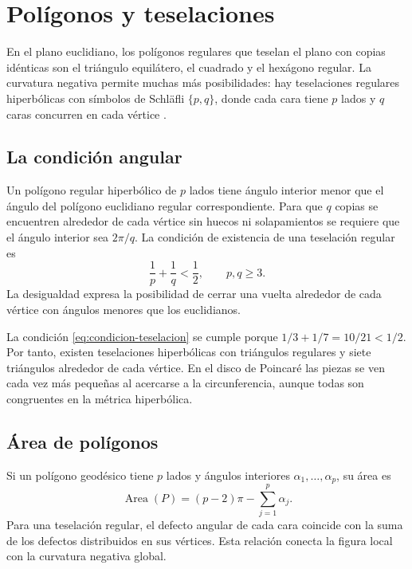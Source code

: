\chapter{Polígonos y teselaciones}
\label{cap:teselaciones}

En el plano euclidiano, los polígonos regulares que teselan el plano con copias idénticas son el triángulo equilátero, el cuadrado y el hexágono regular. La curvatura negativa permite muchas más posibilidades: hay teselaciones regulares hiperbólicas con símbolos de Schläfli \(\{p,q\}\), donde cada cara tiene \(p\) lados y \(q\) caras concurren en cada vértice \cite{stillwell1992}.

\section{La condición angular}

Un polígono regular hiperbólico de \(p\) lados tiene ángulo interior menor que el ángulo del polígono euclidiano regular correspondiente. Para que \(q\) copias se encuentren alrededor de cada vértice sin huecos ni solapamientos se requiere que el ángulo interior sea \(2\pi/q\). La condición de existencia de una teselación regular es
\begin{equation}
  \frac{1}{p}+\frac{1}{q}<\frac{1}{2},\qquad p,q\geq 3.
  \label{eq:condicion-teselacion}
\end{equation}
La desigualdad expresa la posibilidad de cerrar una vuelta alrededor de cada vértice con ángulos menores que los euclidianos.

\begin{example}[El mosaico \(\{3,7\}\)]
La condición \cref{eq:condicion-teselacion} se cumple porque \(1/3+1/7=10/21<1/2\). Por tanto, existen teselaciones hiperbólicas con triángulos regulares y siete triángulos alrededor de cada vértice. En el disco de Poincaré las piezas se ven cada vez más pequeñas al acercarse a la circunferencia, aunque todas son congruentes en la métrica hiperbólica.
\end{example}

\section{Área de polígonos}

Si un polígono geodésico tiene \(p\) lados y ángulos interiores \(\alpha_1,\ldots,\alpha_p\), su área es
\begin{equation}
  \operatorname{Area}(P)=(p-2)\pi-\sum_{j=1}^{p}\alpha_j.
  \label{eq:area-poligono}
\end{equation}
Para una teselación regular, el defecto angular de cada cara coincide con la suma de los defectos distribuidos en sus vértices. Esta relación conecta la figura local con la curvatura negativa global.

